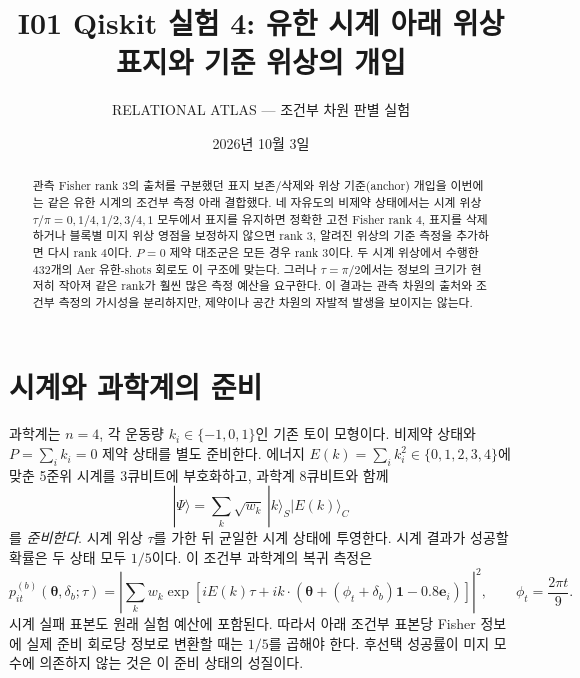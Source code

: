 \documentclass[11pt,a4paper]{article}
\title{I01 Qiskit 실험 4: 유한 시계 아래 위상 표지와 기준 위상의 개입}
\author{RELATIONAL ATLAS --- 조건부 차원 판별 실험}
\date{2026년 10월 3일}
\begin{document}
\maketitle

\begin{abstract}
관측 Fisher rank 3의 출처를 구분했던 표지 보존/삭제와 위상 기준(anchor)
개입을 이번에는 같은 유한 시계의 조건부 측정 아래 결합했다. 네 자유도의
비제약 상태에서는 시계 위상 $\tau/\pi=0,1/4,1/2,3/4,1$ 모두에서 표지를
유지하면 정확한 고전 Fisher rank 4, 표지를 삭제하거나 블록별 미지 위상
영점을 보정하지 않으면 rank 3, 알려진 위상의 기준 측정을 추가하면 다시
rank 4이다. $P=0$ 제약 대조군은 모든 경우 rank 3이다. 두 시계 위상에서
수행한 432개의 Aer 유한-shots 회로도 이 구조에 맞는다. 그러나
$\tau=\pi/2$에서는 정보의 크기가 현저히 작아져 같은 rank가 훨씬 많은
측정 예산을 요구한다. 이 결과는 관측 차원의 출처와 조건부 측정의
가시성을 분리하지만, 제약이나 공간 차원의 자발적 발생을 보이지는 않는다.
\end{abstract}

\section{시계와 과학계의 준비}
과학계는 $n=4$, 각 운동량 $k_i\in\{-1,0,1\}$인 기존 토이 모형이다.
비제약 상태와 $P=\sum_i k_i=0$ 제약 상태를 별도 준비한다. 에너지
$E(k)=\sum_i k_i^2\in\{0,1,2,3,4\}$에 맞춘 5준위 시계를 3큐비트에
부호화하고, 과학계 8큐비트와 함께
\begin{equation}
 |\Psi\rangle=\sum_k\sqrt{w_k}\,|k\rangle_S|E(k)\rangle_C
\end{equation}
를 \emph{준비한다}. 시계 위상 $\tau$를 가한 뒤 균일한 시계 상태에
투영한다. 시계 결과가 성공할 확률은 두 상태 모두 $1/5$이다. 이
조건부 과학계의 복귀 측정은
\begin{equation}
 p_{it}^{(b)}(\boldsymbol\theta,\delta_b;\tau)=
 \left|\sum_k w_k\exp\!\left[iE(k)\tau+
 i k\!\cdot\!\left(\boldsymbol\theta+
 (\phi_t+\delta_b)\boldsymbol1-0.8\boldsymbol e_i\right)\right]\right|^2,
 \qquad \phi_t=\frac{2\pi t}{9}.
 \label{eq:conditional}
\end{equation}
시계 실패 표본도 원래 실험 예산에 포함된다. 따라서 아래 조건부 표본당
Fisher 정보에 실제 준비 회로당 정보로 변환할 때는 $1/5$를 곱해야 한다.
후선택 성공률이 미지 모수에 의존하지 않는 것은 이 준비 상태의 성질이다.
\end{document}
